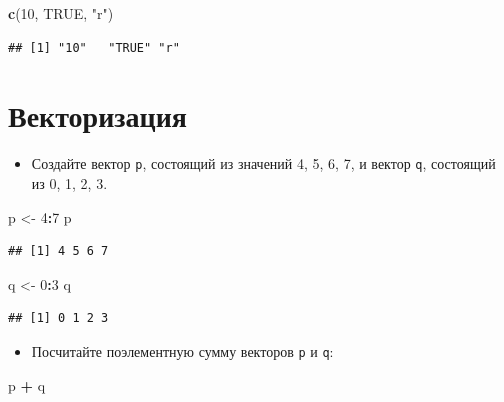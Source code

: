 \documentclass[]{book}
\newenvironment{Shaded}{\begin{snugshade}}{\end{snugshade}}
\newcommand{\KeywordTok}[1]{\textcolor[rgb]{0.13,0.29,0.53}{\textbf{#1}}}
\newcommand{\DecValTok}[1]{\textcolor[rgb]{0.00,0.00,0.81}{#1}}
\newcommand{\StringTok}[1]{\textcolor[rgb]{0.31,0.60,0.02}{#1}}
\newcommand{\OtherTok}[1]{\textcolor[rgb]{0.56,0.35,0.01}{#1}}
\newcommand{\OperatorTok}[1]{\textcolor[rgb]{0.81,0.36,0.00}{\textbf{#1}}}
\newcommand{\NormalTok}[1]{#1}
\providecommand{\tightlist}{%
  \setlength{\itemsep}{0pt}\setlength{\parskip}{0pt}}
\begin{document}
\begin{Shaded}
\begin{Highlighting}[]
\KeywordTok{c}\NormalTok{(}\DecValTok{10}\NormalTok{, }\OtherTok{TRUE}\NormalTok{, }\StringTok{"r"}\NormalTok{)}
\end{Highlighting}
\end{Shaded}

\begin{verbatim}
## [1] "10"   "TRUE" "r"
\end{verbatim}

\section{Векторизация}\label{solution_vec_ion}

\begin{itemize}
\tightlist
\item
  Создайте вектор \texttt{p}, состоящий из значений 4, 5, 6, 7, и вектор
  \texttt{q}, состоящий из 0, 1, 2, 3.
\end{itemize}

\begin{Shaded}
\begin{Highlighting}[]
\NormalTok{p <-}\StringTok{ }\DecValTok{4}\OperatorTok{:}\DecValTok{7}
\NormalTok{p}
\end{Highlighting}
\end{Shaded}

\begin{verbatim}
## [1] 4 5 6 7
\end{verbatim}

\begin{Shaded}
\begin{Highlighting}[]
\NormalTok{q <-}\StringTok{ }\DecValTok{0}\OperatorTok{:}\DecValTok{3}
\NormalTok{q}
\end{Highlighting}
\end{Shaded}

\begin{verbatim}
## [1] 0 1 2 3
\end{verbatim}

\begin{itemize}
\tightlist
\item
  Посчитайте поэлементную сумму векторов \texttt{p} и \texttt{q}:
\end{itemize}

\begin{Shaded}
\begin{Highlighting}[]
\NormalTok{p }\OperatorTok{+}\StringTok{ }\NormalTok{q}
\end{Highlighting}
\end{Shaded}
\end{document}
